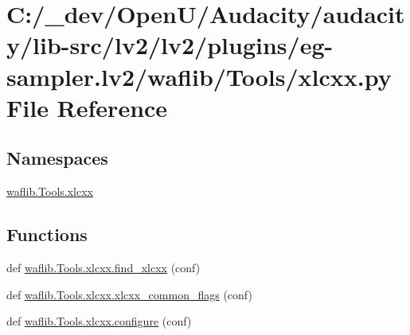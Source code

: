 \hypertarget{lv2_2plugins_2eg-sampler_8lv2_2waflib_2_tools_2xlcxx_8py}{}\section{C\+:/\+\_\+dev/\+Open\+U/\+Audacity/audacity/lib-\/src/lv2/lv2/plugins/eg-\/sampler.lv2/waflib/\+Tools/xlcxx.py File Reference}
\label{lv2_2plugins_2eg-sampler_8lv2_2waflib_2_tools_2xlcxx_8py}
\subsection*{Namespaces}
\begin{DoxyCompactItemize}
\item 
 \hyperlink{namespacewaflib_1_1_tools_1_1xlcxx}{waflib.\+Tools.\+xlcxx}
\end{DoxyCompactItemize}
\subsection*{Functions}
\begin{DoxyCompactItemize}
\item 
def \hyperlink{namespacewaflib_1_1_tools_1_1xlcxx_a8620e3d06d6be208c56bd82ebc223078}{waflib.\+Tools.\+xlcxx.\+find\+\_\+xlcxx} (conf)
\item 
def \hyperlink{namespacewaflib_1_1_tools_1_1xlcxx_a595cde6fb1bcdb1dea9bbabf310a807b}{waflib.\+Tools.\+xlcxx.\+xlcxx\+\_\+common\+\_\+flags} (conf)
\item 
def \hyperlink{namespacewaflib_1_1_tools_1_1xlcxx_a711febe8407f7d68502ceddf57b6a749}{waflib.\+Tools.\+xlcxx.\+configure} (conf)
\end{DoxyCompactItemize}
